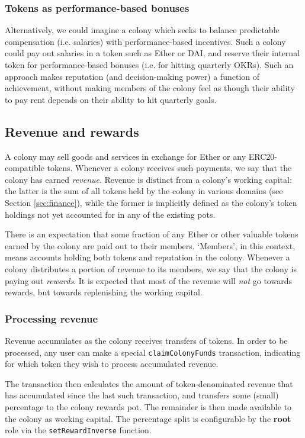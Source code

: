 \subsubsection*{Tokens as performance-based bonuses}

Alternatively, we could imagine a colony which seeks to balance predictable compensation (i.e. salaries) with performance-based incentives. Such a colony could pay out salaries in a token such as Ether or DAI, and reserve their internal token for performance-based bonuses (i.e. for hitting quarterly OKRs). Such an approach makes reputation (and decision-making power) a function of achievement, without making members of the colony feel as though their ability to pay rent depends on their ability to hit quarterly goals.

\subsection{Revenue and rewards}\label{sec:revenue}

A colony may sell goods and services in exchange for Ether or any ERC20-compatible tokens. Whenever a colony receives such payments, we say that the colony has earned \emph{revenue}. Revenue is distinct from a colony's working capital: the latter is the sum of all tokens held by the colony in various domains (see Section \ref{sec:finance}), while the former is implicitly defined as the colony's token holdings not yet accounted for in any of the existing pots.

There is an expectation that some fraction of any Ether or other valuable tokens earned by the colony are paid out to their members. `Members', in this context, means accounts holding both tokens and reputation in the colony. Whenever a colony distributes a portion of revenue to its members, we say that the colony is paying out \emph{rewards}. It is expected that most of the revenue will \emph{not} go towards rewards, but towards replenishing the working capital.

\subsubsection{Processing revenue}

Revenue accumulates as the colony receives transfers of tokens. In order to be processed, any user can make a special \texttt{claimColonyFunds} transaction, indicating for which token they wish to process accumulated revenue.

The transaction then calculates the amount of token-denominated revenue that has accumulated since the last such transaction, and transfers some (small) percentage to the colony rewards pot. The remainder is then made available to the colony as working capital. The percentage split is configurable by the \textbf{root} role via the \texttt{setRewardInverse} function.

